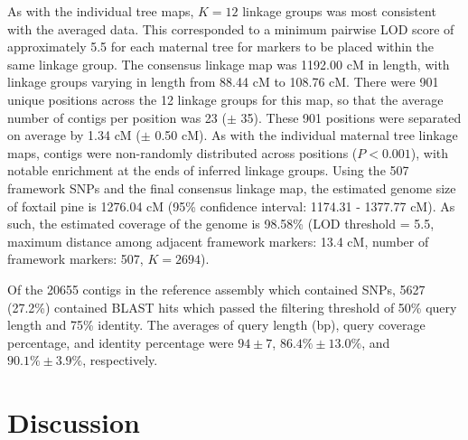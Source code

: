 \documentclass[11pt]{article}
\begin{document}
As with the individual tree maps, $K = 12$ linkage groups was most consistent with the averaged data. This corresponded to a minimum pairwise 
LOD score of approximately 5.5 for each maternal tree for markers to be placed within the same linkage group.
The consensus linkage map was 1192.00 cM in length, with linkage groups varying in length from 88.44 cM to 108.76 cM. There were 901 unique positions
across the 12 linkage groups for this map, so that the average number of contigs per position was 23 ($\pm$ 35). These 901 positions
were separated on average by 1.34 cM ($\pm$ 0.50 cM). As with the individual maternal tree linkage maps, contigs were non-randomly distributed 
across positions ($P < 0.001$), with notable enrichment at the ends of inferred linkage groups. Using the 507 framework SNPs and the final consensus linkage map, 
the estimated genome size of foxtail pine is 1276.04 cM (95\% confidence interval: 1174.31 - 1377.77 cM). As such, the estimated coverage of the genome 
is 98.58\% (LOD threshold = 5.5, maximum distance among adjacent framework markers: 13.4 cM, number of framework markers: 507, $K = 2694$). 

Of the \num{20655} contigs in the reference assembly which contained SNPs, \num{5627} (27.2\%) contained BLAST hits which 
passed the filtering threshold of 50\% query length and 75\% identity.  The averages of query length (bp), query coverage percentage, 
and identity percentage were $94 \pm 7$, $86.4\% \pm 13.0\%$, and $90.1\% \pm 3.9\%$, respectively. 

\section*{Discussion}
\end{document}

